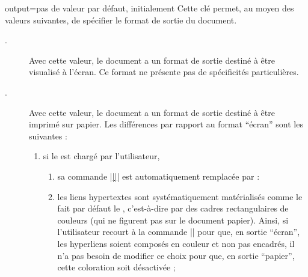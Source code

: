 \begin{docKey}{output}{=\textbar{}\textbar{}}{pas
    de valeur par défaut, initialement }
  Cette clé permet, au moyen des valeurs suivantes, de spécifier le format de
  sortie du document.
  \begin{description}
  \item[.]%
    Avec cette valeur, le document a un format de sortie destiné à être
    visualisé à l'écran. Ce format ne présente pas de spécificités
    particulières.
  \item[.]%
    Avec cette valeur, le document a un format de sortie
    destiné à être imprimé sur papier. Les différences par rapport au format
    \enquote{écran} sont les suivantes :
    \begin{enumerate}
    \item%
      si le  est chargé par l'utilisateur,
      \begin{enumerate}
      \item\label{item-paper-1}%
        sa commande |\href{|\meta{\normalfont\ttfamily\glsxtrshort*{url}}|}{||}| est
        automatiquement remplacée par :
      \item les liens hypertextes sont systématiquement matérialisés comme le
        fait par défaut le , c'est-à-dire par des cadres
        rectangulaires de couleurs (qui ne figurent pas sur le document
        papier). Ainsi, si l'utilisateur recourt à la commande
        |\hypersetup{colorlinks=true}| pour que, en sortie \enquote{écran}, les
        hyperliens soient composés en couleur et non pas encadrés, il n'a pas
        besoin de modifier ce choix pour que, en sortie \enquote{papier}, cette
        coloration soit désactivée ;

\end{enumerate}
\end{enumerate}
\end{description}
\end{docKey}
